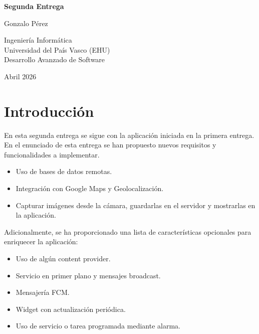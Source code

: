 \documentclass{article}
\begin{document}
\begin{titlepage}
    \centering
    \vspace*{2cm}

    {\Huge \bfseries Segunda Entrega\par}
    \vspace{1.5cm}

    {\Large Gonzalo Pérez\par}
    \vspace{1cm}

    {\large Ingeniería Informática\\
        Universidad del País Vasco (EHU) \\
        Desarrollo Avanzado de Software\par}
    \vspace{2cm}

    {\large Abril 2026\par}

    \vfill
\end{titlepage}


\tableofcontents
\newpage


\section{Introducción}

En esta segunda entrega se sigue con la aplicación iniciada en la primera entrega. En el enunciado de esta entrega se han propuesto nuevos requisitos y funcionalidades a implementar.

\begin{itemize}
    \item Uso de bases de datos remotas.
    \item Integración con Google Maps y Geolocalización.
    \item Capturar imágenes desde la cámara, guardarlas en el servidor y mostrarlas en la aplicación.
\end{itemize}

Adicionalmente, se ha proporcionado una lista de características opcionales para enriquecer la aplicación:

\begin{itemize}
    \item Uso de algún content provider.
    \item Servicio en primer plano y mensajes broadcast.
    \item Mensajería FCM.
    \item Widget con actualización periódica.
    \item Uso de servicio o tarea programada mediante alarma.
\end{itemize}
\end{document}
